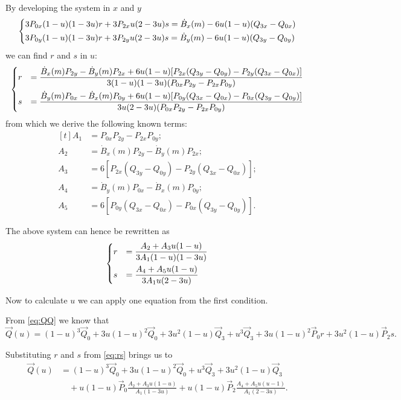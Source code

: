 \documentclass{scrartcl}
\newcommand\V[1]{\vec{#1}}
\newcommand\D[1]{\dot{#1}}
\begin{document}
By developing the system in $x$ and $y$
\begin{equation*}
\begin{dcases}
    3 P_{0x} (1-u) (1-3u) r + 3 P_{2x} u (2-3u) s = \D{B}_x(m) - 6u (1-u) (Q_{3x} - Q_{0x}) \\
    3 P_{0y} (1-u) (1-3u) r + 3 P_{2y} u (2-3u) s = \D{B}_y(m) - 6u (1-u) (Q_{3y} - Q_{0y})
\end{dcases}
\end{equation*}
we can find $r$ and $s$ in $u$:
\begin{equation*}
\begin{dcases}
    r &= \frac{\D{B}_x(m) P_{2y} - \D{B}_y(m) P_{2x} + 6u (1-u) [ P_{2x} (Q_{3y} - Q_{0y}) - P_{2y} (Q_{3x} - Q_{0x}) ]}
	{3 (1-u) (1-3u) ( P_{0x} P_{2y} - P_{2x} P_{0y} )} \\
    s &= \frac{\D{B}_y(m) P_{0x} - \D{B}_x(m) P_{0y} + 6u (1-u) [ P_{0y} (Q_{3x} - Q_{0x}) - P_{0x} (Q_{3y} - Q_{0y}) ]}
	{3u (2-3u) ( P_{0x} P_{2y} - P_{2x} P_{0y} )}
\end{dcases}
\end{equation*}
from which we derive the following known terms:
\begin{equation}\label{eq:terms}
\begin{aligned}[t]
    A_1 &= P_{0x} P_{2y} - P_{2x} P_{0y}; \\
    A_2 &= \D{B}_x(m) P_{2y} - \D{B}_y(m) P_{2x}; \\
    A_3 &= 6 [ P_{2x} (Q_{3y} - Q_{0y}) - P_{2y} (Q_{3x} - Q_{0x}) ]; \\
    A_4 &= \D{B}_y(m) P_{0x} - \D{B}_x(m) P_{0y}; \\
    A_5 &= 6 [ P_{0y} (Q_{3x} - Q_{0x}) - P_{0x} (Q_{3y} - Q_{0y}) ].
\end{aligned}
\end{equation}

The above system can hence be rewritten as
\begin{equation}\label{eq:rs}
\begin{dcases}
    r &= \frac{A_2 + A_3 u (1-u)}{3 A_1 (1-u) (1-3u)} \\
    s &= \frac{A_4 + A_5 u (1-u)}{3 A_1 u (2-3u)}
\end{dcases}
\end{equation}

Now to calculate $u$ we can apply one equation from the first condition.

From \eqref{eq:QQ} we know that
\begin{equation*}
    \V{Q}(u) =
	(1-u)^3 \V{Q}_0 +
	3u (1-u)^2 \V{Q}_0 +
	3u^2 (1-u) \V{Q}_3 +
	u^3 \V{Q}_3 +
	3u (1-u)^2 \V{P}_0 r +
	3u^2 (1-u) \V{P}_2 s.
\end{equation*}

Substituting $r$ and $s$ from \eqref{eq:rs} brings us to
\begin{equation*}
\begin{split}
    \V{Q}(u) &= (1-u)^3 \V{Q}_0 + 3u (1-u)^2 \V{Q}_0 + u^3 \V{Q}_3 + 3u^2 (1-u) \V{Q}_3 \\
     & \quad + u (1-u) \V{P}_0 \frac{A_2 + A_3 u (1-u)}{A_1 (1-3u)}
	+ u (1-u) \V{P}_2 \frac{A_4 + A_5 u (u-1)}{A_1 (2-3u)}.
\end{split}
\end{equation*}
\end{document}
